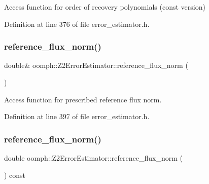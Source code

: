 Access function for order of recovery polynomials (const version) 



Definition at line 376 of file error\+\_\+estimator.\+h.

\mbox{\label{classoomph_1_1Z2ErrorEstimator_a997dc6ba0b546a0f7363949a8d33d133}} 
\subsubsection{\texorpdfstring{reference\+\_\+flux\+\_\+norm()}{reference\_flux\_norm()}\hspace{0.1cm}{\footnotesize\ttfamily [1/2]}}
{\footnotesize\ttfamily double\& oomph\+::\+Z2\+Error\+Estimator\+::reference\+\_\+flux\+\_\+norm (\begin{DoxyParamCaption}{ }\end{DoxyParamCaption})\hspace{0.3cm}{\ttfamily [inline]}}



Access function for prescribed reference flux norm. 



Definition at line 397 of file error\+\_\+estimator.\+h.

\mbox{\label{classoomph_1_1Z2ErrorEstimator_a4a7902d3e80dc64406e1f367c02ec4e3}} 
\subsubsection{\texorpdfstring{reference\+\_\+flux\+\_\+norm()}{reference\_flux\_norm()}\hspace{0.1cm}{\footnotesize\ttfamily [2/2]}}
{\footnotesize\ttfamily double oomph\+::\+Z2\+Error\+Estimator\+::reference\+\_\+flux\+\_\+norm (\begin{DoxyParamCaption}{ }\end{DoxyParamCaption}) const\hspace{0.3cm}{\ttfamily [inline]}}



